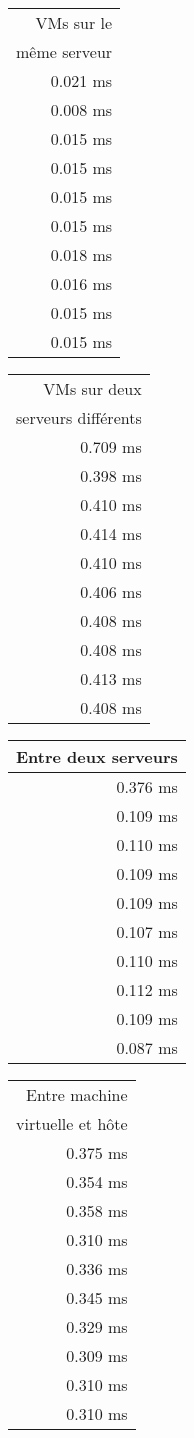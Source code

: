 \documentclass[a4paper]{article}
\begin{document}
\begin{center}
\begin{tabular}{r}
VMs sur le\\ même serveur\\ \hline
0.021 ms\\
0.008 ms\\
0.015 ms\\
0.015 ms\\
0.015 ms\\
0.015 ms\\
0.018 ms\\
0.016 ms\\
0.015 ms\\
0.015 ms
\end{tabular}
\begin{tabular}{r}
VMs sur deux\\ serveurs différents\\ \hline
0.709 ms\\
0.398 ms\\
0.410 ms\\
0.414 ms\\
0.410 ms\\
0.406 ms\\
0.408 ms\\
0.408 ms\\
0.413 ms\\
0.408 ms
\end{tabular}
\begin{tabular}{r}
\\Entre deux serveurs\\ \hline
0.376 ms \\
0.109 ms \\
0.110 ms \\
0.109 ms \\
0.109 ms \\
0.107 ms \\
0.110 ms \\
0.112 ms \\
0.109 ms \\
0.087 ms
\end{tabular}
\begin{tabular}{r}
Entre machine \\virtuelle et hôte \\ \hline
0.375 ms \\
0.354 ms \\
0.358 ms \\
0.310 ms \\
0.336 ms \\
0.345 ms \\
0.329 ms \\
0.309 ms \\
0.310 ms \\
0.310 ms
\end{tabular}
\end{center}
\end{document}

